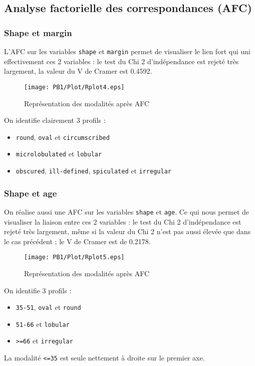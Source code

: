 \documentclass[a4paper]{report}
\begin{document}
  \subsection{Analyse factorielle des correspondances (AFC)}
   
   \subsubsection{Shape et margin}
   L'AFC sur les variables \verb|shape| et \verb|margin| permet de visualiser le lien fort qui uni effectivement ces 2 variables : le test du Chi 2 d'indépendance est rejeté très largement, la valeur du V de Cramer est 0.4592. 

      \begin{figure}[!ht]
	\centering
     	\texttt{[image: PB1/Plot/Rplot4.eps]}

	\caption{Représentation des modalités après AFC}
\end{figure}

   On identifie clairement 3 profils : 
   \begin{itemize}
   \item \verb|round|, \verb|oval| et \verb|circumscribed|
   \item \verb|microlobulated| et \verb|lobular|
   \item \verb|obscured|, \verb|ill-defined|, \verb|spiculated| et \verb|irregular|
   \end{itemize}
   
   
      \subsubsection{Shape et age}
   On réalise aussi une AFC sur les variables \verb|shape| et \verb|age|. Ce qui nous permet de visualiser la liaison entre ces 2 variables : le test du Chi 2 d'indépendance est rejeté très largement, même si la valeur du Chi 2 n'est pas aussi élevée que dans le cas précédent ; le V de Cramer est de 0.2178. 

      \begin{figure}[!ht]
	\centering
     	\texttt{[image: PB1/Plot/Rplot5.eps]}

	\caption{Représentation des modalités après AFC}
\end{figure}

   On identifie 3 profils : 
   \begin{itemize}
      \item \verb|35-51|, \verb|oval| et \verb|round|
   \item \verb|51-66| et \verb|lobular|
      \item \verb|>=66| et \verb|irregular|
   \end{itemize}
   La modalité \verb|<=35| est seule nettement à droite sur le premier axe. 
\end{document}
